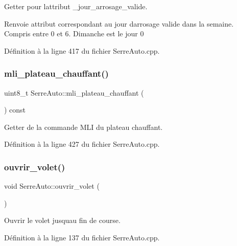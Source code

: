 Getter pour l\textquotesingle{}attribut \+\_\+jour\+\_\+arrosage\+\_\+valide. 

\begin{DoxyReturn}{Renvoie}
attribut correspondant au jour d\textquotesingle{}arrosage valide dans la semaine. Compris entre 0 et 6. Dimanche est le jour 0 
\end{DoxyReturn}


Définition à la ligne 417 du fichier Serre\+Auto.\+cpp.

\mbox{\label{class_serre_auto_ae8880f934e9aeb1cecf9541dce0eeb8f}} 
\subsubsection{mli\+\_\+plateau\+\_\+chauffant()}
{\footnotesize\ttfamily uint8\+\_\+t Serre\+Auto\+::mli\+\_\+plateau\+\_\+chauffant (\begin{DoxyParamCaption}{ }\end{DoxyParamCaption}) const}



Getter de la commande M\+LI du plateau chauffant. 



Définition à la ligne 427 du fichier Serre\+Auto.\+cpp.

\mbox{\label{class_serre_auto_a294d1c117b4db9b15c8760bd2c9ddca1}} 
\subsubsection{ouvrir\+\_\+volet()}
{\footnotesize\ttfamily void Serre\+Auto\+::ouvrir\+\_\+volet (\begin{DoxyParamCaption}{ }\end{DoxyParamCaption})}



Ouvrir le volet jusqu\textquotesingle{}au fin de course. 



Définition à la ligne 137 du fichier Serre\+Auto.\+cpp.

\mbox{\label{class_serre_auto_a5e440bbc11d445b765e754ee03a97e5f}} 
